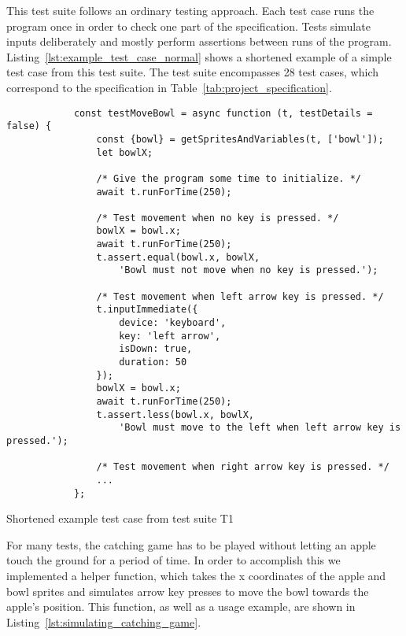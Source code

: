 This test suite follows an ordinary testing approach.
Each test case runs the program once in order to check one part of the specification.
Tests simulate inputs deliberately and mostly perform assertions between runs of the program.
Listing~\ref{lst:example_test_case_normal} shows a shortened example of a simple test case from this test suite.
The test suite encompasses 28 test cases, which correspond to the specification in Table~\ref{tab:project_specification}.
\parspace

\begin{listing}[ht]
    \centering
    \begin{minipage}{.70\textwidth}
        \begin{verbatim}
            const testMoveBowl = async function (t, testDetails = false) {
                const {bowl} = getSpritesAndVariables(t, ['bowl']);
                let bowlX;

                /* Give the program some time to initialize. */
                await t.runForTime(250);

                /* Test movement when no key is pressed. */
                bowlX = bowl.x;
                await t.runForTime(250);
                t.assert.equal(bowl.x, bowlX,
                    'Bowl must not move when no key is pressed.');

                /* Test movement when left arrow key is pressed. */
                t.inputImmediate({
                    device: 'keyboard',
                    key: 'left arrow',
                    isDown: true,
                    duration: 50
                });
                bowlX = bowl.x;
                await t.runForTime(250);
                t.assert.less(bowl.x, bowlX,
                    'Bowl must move to the left when left arrow key is pressed.');

                /* Test movement when right arrow key is pressed. */
                ...
            };
        \end{verbatim}
    \end{minipage}

    \caption{Shortened example test case from test suite T1}
    \label{lst:example_test_case_normal}
\end{listing}

For many tests, the catching game has to be played without letting an apple touch the ground for a period of time.
In order to accomplish this we implemented a helper function,
which takes the x coordinates of the apple and bowl sprites and
simulates arrow key presses to move the bowl towards the apple's position.
This function, as well as a usage example, are shown in Listing~\ref{lst:simulating_catching_game}.


